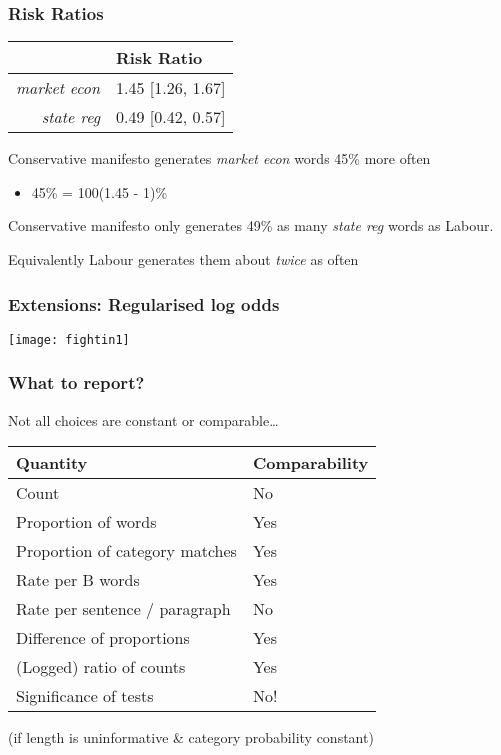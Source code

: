 \documentclass[11pt,compress,professionalfonts]{beamer}
\newcommand{\ita}{\begin{itemize}}
\newcommand{\itm}{\item[]}
\newcommand{\itz}{\end{itemize}}
\begin{document}
\begin{frame}[t,fragile]\frametitle{Risk Ratios}
\begin{center}
\begin{tabular}{rl} \toprule
& Risk Ratio\\ \midrule
\textsl{market econ} & 1.45 [1.26, 1.67]\\
\textsl{state reg} & 0.49 [0.42, 0.57] \\ \bottomrule
\end{tabular}
\end{center}

Conservative manifesto generates \textsl{market econ} words 45\% more often
\ita
\itm 45\% = 100(1.45 - 1)\%
\itz
Conservative manifesto only generates 49\% as many \textsl{state reg} words as Labour.

Equivalently Labour generates them about \textsl{twice} as often

\end{frame}
\begin{frame}[t,fragile]\frametitle{Extensions: Regularised log odds}

\centerline{\texttt{[image: fightin1]}}


\end{frame}
\begin{frame}[t,fragile]\frametitle{What to report?}

Not all choices are constant or comparable\ldots

{\small
\begin{center}
\begin{tabular}{ll} \toprule
Quantity & Comparability\\ \midrule
Count & No \\
Proportion of words & Yes\\
Proportion of category matches & Yes\\
Rate per B words & Yes\\
Rate per sentence / paragraph & No\\
Difference of proportions & Yes\\
(Logged) ratio of counts & Yes\\
Significance of tests & No!\\
\bottomrule
\end{tabular}
\end{center}
\normalsize}

(if length is uninformative \& category probability constant)



\end{frame}
\end{document}
